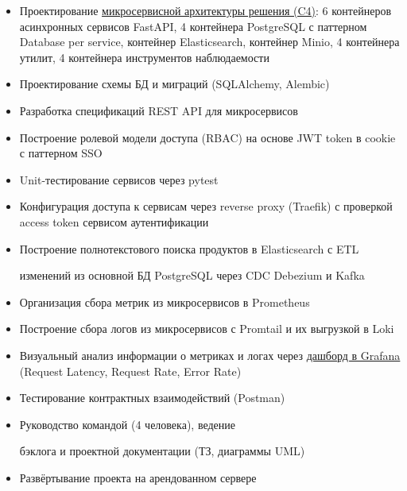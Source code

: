 \documentclass[14pt, a4paper, oneside]{extarticle}
\begin{document}
\begin{itemize}
	\vspace{-2\intextsep}
	\item Проектирование \href{https://github.com/Crazy5202/job_application_form/tree/main/portfolio/eComm_C4.pdf}{микросервисной архитектуры решения (C4)}: 6 контейнеров асинхронных сервисов FastAPI, 4 контейнера PostgreSQL с паттерном Database per service, контейнер Elasticsearch, контейнер Minio, 4 контейнера утилит, 4 контейнера инструментов наблюдаемости 
	\vspace{-0.8\intextsep}
	\item Проектирование схемы БД и миграций (SQLAlchemy, Alembic)
	\vspace{-0.8\intextsep}
	\item Разработка спецификаций REST API для микросервисов
	\vspace{-0.8\intextsep}
	\item Построение ролевой модели доступа (RBAC) на основе JWT token в cookie с паттерном SSO
	\vspace{-0.8\intextsep}
	\item Unit-тестирование сервисов через pytest
	\vspace{-0.8\intextsep}
	\item Конфигурация доступа к сервисам через reverse proxy (Traefik) с проверкой access token сервисом аутентификации
	\vspace{-0.8\intextsep}
	\item Построение полнотекстового поиска продуктов в Elasticsearch с ETL
	
	\vspace{-0.5\intextsep} 
	изменений из основной БД PostgreSQL через CDC Debezium и Kafka
	\vspace{-0.8\intextsep}
	\item Организация сбора метрик из микросервисов в Prometheus
	\vspace{-0.8\intextsep}
	\item Построение сбора логов из микросервисов с Promtail и их выгрузкой в Loki
	\vspace{-0.8\intextsep}
	\item Визуальный анализ информации о метриках и логах через \href{https://github.com/Crazy5202/job_application_form/tree/main/portfolio/eComm_Grafana.pdf}{дашборд в Grafana} (Request Latency, Request Rate, Error Rate)
	\vspace{-0.8\intextsep}
	\item Тестирование контрактных взаимодействий (Postman)
	\vspace{-0.8\intextsep}
    \item Руководство командой (4 человека), ведение 

    \vspace{-0.5\intextsep}
    бэклога и проектной документации (ТЗ, диаграммы UML)
    \vspace{-0.8\intextsep}
    \item Развёртывание проекта на арендованном сервере
\end{itemize}
\end{document}
